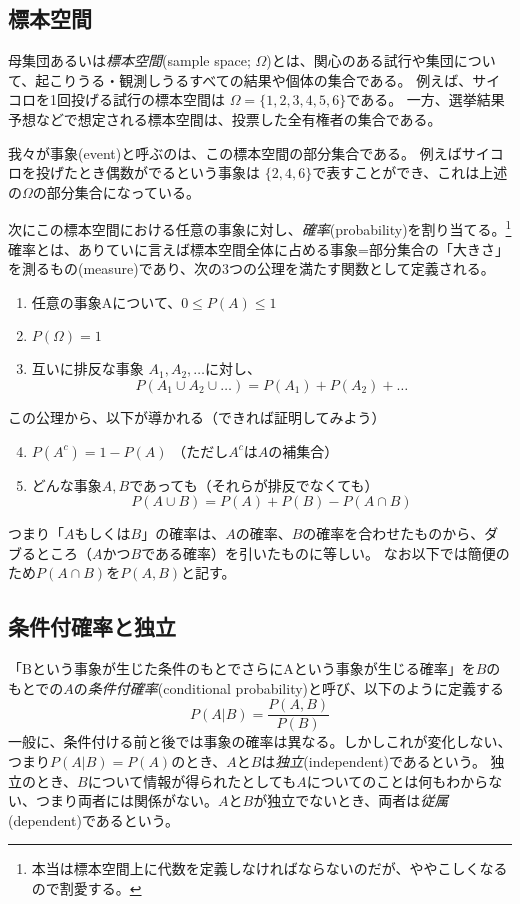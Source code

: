 \documentclass{jsarticle}
\begin{document}
\subsection{標本空間}
母集団あるいは\emph{標本空間}(sample space; $\Omega$)とは、関心のある試行や集団について、起こりうる・観測しうるすべての結果や個体の集合である。
例えば、サイコロを1回投げる試行の標本空間は $\Omega = \{1, 2, 3, 4, 5, 6 \}$である。
一方、選挙結果予想などで想定される標本空間は、投票した全有権者の集合である。

我々が事象(event)と呼ぶのは、この標本空間の部分集合である。
例えばサイコロを投げたとき偶数がでるという事象は $\{2, 4, 6\}$で表すことができ、これは上述の$\Omega$の部分集合になっている。

次にこの標本空間における任意の事象に対し、\emph{確率}(probability)を割り当てる。\footnote{本当は標本空間上に代数を定義しなければならないのだが、ややこしくなるので割愛する。}
確率とは、ありていに言えば標本空間全体に占める事象=部分集合の「大きさ」を測るもの(measure)であり、次の3つの公理を満たす関数として定義される。

\begin{enumerate}
\item 任意の事象Aについて、$0 \leq P(A) \leq 1$
\item $P(\Omega)= 1$
\item 互いに排反な事象 $A_1, A_2, \dots$に対し、$$P(A_1 \cup A_2 \cup \dots) = P(A_1) + P(A_2) + \dots$$
\end{enumerate}

\noindent
この公理から、以下が導かれる（できれば証明してみよう）
\begin{enumerate}
 \setcounter{enumi}{3}
 \item $P(A^c) = 1 - P(A)$ （ただし$A^c$は$A$の補集合）
 \item どんな事象$A, B$であっても（それらが排反でなくても）$$P(A \cup B) = P(A) + P(B) - P(A \cap  B) $$
\end{enumerate}
つまり「$A$もしくは$B$」の確率は、$A$の確率、$B$の確率を合わせたものから、ダブるところ（$A$かつ$B$である確率）を引いたものに等しい。
なお以下では簡便のため$P(A \cap B)$を$P(A, B)$と記す。

\subsection{条件付確率と独立}
「Bという事象が生じた条件のもとでさらにAという事象が生じる確率」を$B$のもとでの$A$の\emph{条件付確率}(conditional probability)と呼び、以下のように定義する
$$ P(A|B) = \frac{P(A, B)}{P(B)}$$
一般に、条件付ける前と後では事象の確率は異なる。しかしこれが変化しない、つまり$P(A|B)=P(A)$のとき、$A$と$B$は\emph{独立}(independent)であるという。
独立のとき、$B$について情報が得られたとしても$A$についてのことは何もわからない、つまり両者には関係がない。$A$と$B$が独立でないとき、両者は\emph{従属}(dependent)であるという。
\end{document}
